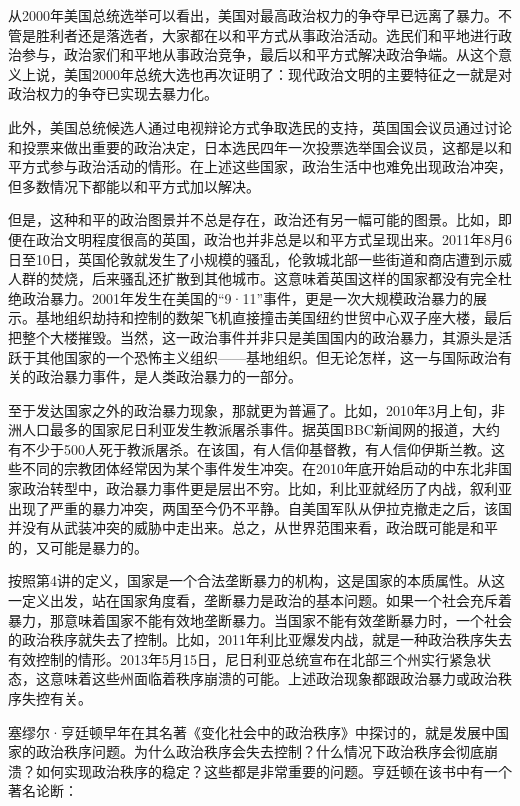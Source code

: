从2000年美国总统选举可以看出，美国对最高政治权力的争夺早已远离了暴力。不管是胜利者还是落选者，大家都在以和平方式从事政治活动。选民们和平地进行政治参与，政治家们和平地从事政治竞争，最后以和平方式解决政治争端。从这个意义上说，美国2000年总统大选也再次证明了：现代政治文明的主要特征之一就是对政治权力的争夺已实现去暴力化。

此外，美国总统候选人通过电视辩论方式争取选民的支持，英国国会议员通过讨论和投票来做出重要的政治决定，日本选民四年一次投票选举国会议员，这都是以和平方式参与政治活动的情形。在上述这些国家，政治生活中也难免出现政治冲突，但多数情况下都能以和平方式加以解决。

但是，这种和平的政治图景并不总是存在，政治还有另一幅可能的图景。比如，即便在政治文明程度很高的英国，政治也并非总是以和平方式呈现出来。2011年8月6日至10日，英国伦敦就发生了小规模的骚乱，伦敦城北部一些街道和商店遭到示威人群的焚烧，后来骚乱还扩散到其他城市。这意味着英国这样的国家都没有完全杜绝政治暴力。2001年发生在美国的“9·11”事件，更是一次大规模政治暴力的展示。基地组织劫持和控制的数架飞机直接撞击美国纽约世贸中心双子座大楼，最后把整个大楼摧毁。当然，这一政治事件并非只是美国国内的政治暴力，其源头是活跃于其他国家的一个恐怖主义组织——基地组织。但无论怎样，这一与国际政治有关的政治暴力事件，是人类政治暴力的一部分。

至于发达国家之外的政治暴力现象，那就更为普遍了。比如，2010年3月上旬，非洲人口最多的国家尼日利亚发生教派屠杀事件。据英国BBC新闻网的报道，大约有不少于500人死于教派屠杀。在该国，有人信仰基督教，有人信仰伊斯兰教。这些不同的宗教团体经常因为某个事件发生冲突。在2010年底开始启动的中东北非国家政治转型中，政治暴力事件更是层出不穷。比如，利比亚就经历了内战，叙利亚出现了严重的暴力冲突，两国至今仍不平静。自美国军队从伊拉克撤走之后，该国并没有从武装冲突的威胁中走出来。总之，从世界范围来看，政治既可能是和平的，又可能是暴力的。


按照第4讲的定义，国家是一个合法垄断暴力的机构，这是国家的本质属性。从这一定义出发，站在国家角度看，垄断暴力是政治的基本问题。如果一个社会充斥着暴力，那意味着国家不能有效地垄断暴力。当国家不能有效垄断暴力时，一个社会的政治秩序就失去了控制。比如，2011年利比亚爆发内战，就是一种政治秩序失去有效控制的情形。2013年5月15日，尼日利亚总统宣布在北部三个州实行紧急状态，这意味着这些州面临着秩序崩溃的可能。上述政治现象都跟政治暴力或政治秩序失控有关。

塞缪尔·亨廷顿早年在其名著《变化社会中的政治秩序》中探讨的，就是发展中国家的政治秩序问题。为什么政治秩序会失去控制？什么情况下政治秩序会彻底崩溃？如何实现政治秩序的稳定？这些都是非常重要的问题。亨廷顿在该书中有一个著名论断：

